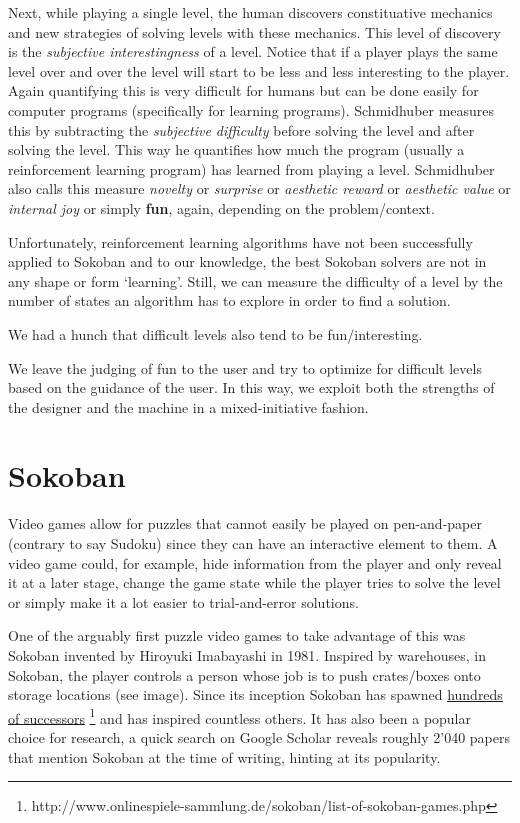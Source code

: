 Next, while playing a single level, the human discovers constituative mechanics and new strategies of solving levels with these mechanics. This level of discovery is the \textit{subjective interestingness} of a level. Notice that if a player plays the same level over and over the level will start to be less and less interesting to the player. Again quantifying this is very difficult for humans but can be done easily for computer programs (specifically for learning programs). Schmidhuber measures this by subtracting the \textit{subjective difficulty} before solving the level and after solving the level. This way he quantifies how much the program (usually a reinforcement learning program) has learned from playing a level. Schmidhuber also calls this measure \textit{novelty} or \textit{surprise} or \textit{aesthetic reward} or \textit{aesthetic value} or \textit{internal joy} or simply \textbf{fun}, again, depending on the problem/context.

Unfortunately, reinforcement learning algorithms have not been successfully applied to Sokoban and to our knowledge, the best Sokoban solvers are not in any shape or form `learning'. Still, we can measure the difficulty of a level by the number of states an algorithm has to explore in order to find a solution.

We had a hunch that difficult levels also tend to be fun/interesting.

We leave the judging of fun to the user and try to optimize for difficult levels based on the guidance of the user. In this way, we exploit both the strengths of the designer and the machine in a mixed-initiative fashion.

\section{Sokoban}

Video games allow for puzzles that cannot easily be played on pen-and-paper (contrary to say Sudoku) since they can have an interactive element to them. A video game could, for example, hide information from the player and only reveal it at a later stage, change the game state while the player tries to solve the level or simply make it a lot easier to trial-and-error solutions.


One of the arguably first puzzle video games to take advantage of this was Sokoban invented by Hiroyuki Imabayashi in 1981. Inspired by warehouses, in Sokoban, the player controls a person whose job is to push crates/boxes onto storage locations (see image). Since its inception Sokoban has spawned \href{http://www.onlinespiele-sammlung.de/sokoban/list-of-sokoban-games.php}{hundreds of successors} \footnote{http://www.onlinespiele-sammlung.de/sokoban/list-of-sokoban-games.php} and has inspired countless others. It has also been a popular choice for research, a quick search on Google Scholar reveals roughly 2'040 papers that mention Sokoban at the time of writing, hinting at its popularity.

